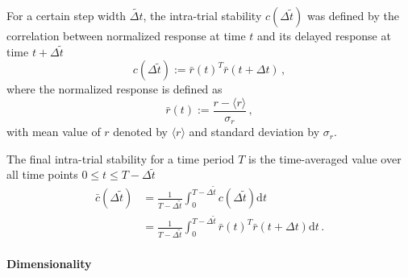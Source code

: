 \documentclass[11pt]{article}
\begin{document}
	For a certain step width $\tilde{\Delta t}$, the intra-trial stability $c(\Delta \tilde{t})$ was defined by the correlation between normalized response at time $t$ and its delayed response at time $t + \Delta \tilde{t}$ 
		\begin{equation}
			c(\Delta \tilde{t}) := \bar{r}(t)^T \bar{r}(t + \Delta t) \, , 
		\end{equation}
	where the normalized response is defined as
		\begin{equation}
			\bar{r}(t) := \frac{r - \langle r \rangle}{\sigma_r} \, ,
		\end{equation}
	with mean value of $r$ denoted by $\langle r \rangle$ and standard deviation by $\sigma_r$. 
	
	The final intra-trial stability for a time period $T$ is the time-averaged value over all time points $0 \leq t \leq T - \Delta \tilde{t}$
		\begin{equation} \label{eq:its_sym}
			\begin{split}
				\bar{c}{(\Delta \tilde{t})} &= \frac{1}{T-\Delta \tilde{t}} \int_{0}^{T-\Delta \tilde{t}} c(\Delta \tilde{t}) \mathrm{d} t\\
				                            &= \frac{1}{T-\Delta \tilde{t}} \int_{0}^{T-\Delta \tilde{t}} \bar{r}(t)^T \bar{r}(t + \Delta t) \mathrm{d} t \, .
			\end{split} 
		\end{equation}
	
	\paragraph{Dimensionality}
	
\end{document}
